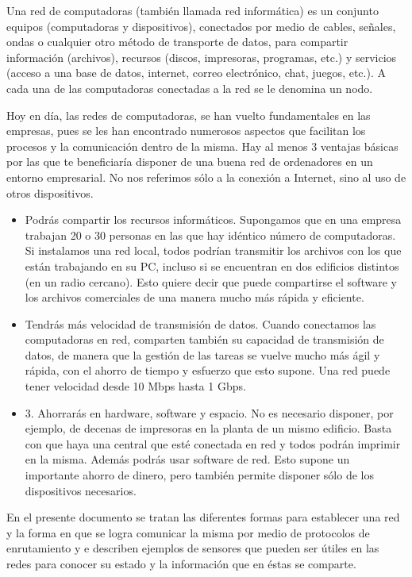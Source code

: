 \noindent
Una red de computadoras (también llamada red informática) es un conjunto equipos (computadoras y dispositivos), conectados por medio de cables, señales, ondas o cualquier otro método de transporte de datos, para compartir información (archivos), recursos (discos, impresoras, programas, etc.) y servicios (acceso a una base de datos, internet, correo electrónico, chat, juegos, etc.). A
cada una de las computadoras conectadas a la red se le denomina un nodo. \cite{def_redComputadoras}

\noindent
\newline
Hoy en día, las redes de computadoras, se han vuelto fundamentales en las empresas, pues se les han encontrado numerosos aspectos que facilitan los procesos y la comunicación dentro de la misma. 
\newline
Hay al menos 3 ventajas básicas por las que te beneficiaría disponer de una buena red de ordenadores en un entorno empresarial. No nos referimos sólo a la conexión a Internet, sino al uso de otros dispositivos.
\begin{itemize}
	\item Podrás compartir los recursos informáticos. Supongamos que en una empresa trabajan 20 o 30 personas en las que hay idéntico número de computadoras. Si instalamos una red local, todos podrían transmitir los archivos con los que están trabajando en su PC, incluso si se encuentran en dos edificios distintos (en un radio cercano). Esto quiere decir que puede compartirse el software y los archivos comerciales de una manera mucho más rápida y eficiente.
	\item Tendrás más velocidad de transmisión de datos. Cuando conectamos las computadoras en red, comparten también su capacidad de transmisión de datos, de manera que la gestión de las tareas se vuelve mucho más ágil y rápida, con el ahorro de tiempo y esfuerzo que esto supone. Una red puede tener velocidad desde 10 Mbps hasta 1 Gbps.
	\item 3. Ahorrarás en hardware, software y espacio. No es necesario disponer, por ejemplo, de decenas de impresoras en la planta de un mismo edificio. Basta con que haya una central que esté conectada en red y todos podrán imprimir en la misma. Además podrás usar software de red. Esto supone un importante ahorro de dinero, pero también permite disponer sólo de los dispositivos necesarios. \cite{ventajas_redEmpresa}
\end{itemize}

\noindent 
En el presente documento se tratan las diferentes formas para establecer una red y la forma en que se logra comunicar la misma por medio de protocolos de enrutamiento y e describen ejemplos de sensores que pueden ser útiles en las redes para conocer su estado y la información que en éstas se comparte.
